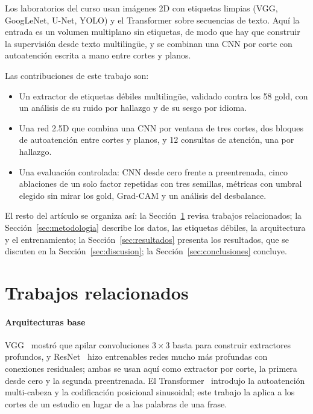 \documentclass[conference]{IEEEtran}
\begin{document}
Los laboratorios del curso usan imágenes 2D con etiquetas limpias (VGG, GoogLeNet, U-Net, YOLO) y el Transformer sobre secuencias de texto.
Aquí la entrada es un volumen multiplano sin etiquetas, de modo que hay que construir la supervisión desde texto multilingüe, y se combinan una CNN por corte con autoatención escrita a mano entre cortes y planos.

Las contribuciones de este trabajo son:
\begin{itemize}
  \item Un extractor de etiquetas débiles multilingüe, validado contra los 58 gold, con un análisis de su ruido por hallazgo y de su sesgo por idioma.
  \item Una red 2.5D que combina una CNN por ventana de tres cortes, dos bloques de autoatención entre cortes y planos, y 12 consultas de atención, una por hallazgo.
  \item Una evaluación controlada: CNN desde cero frente a preentrenada, cinco ablaciones de un solo factor repetidas con tres semillas, métricas con umbral elegido sin mirar los gold, Grad-CAM y un análisis del desbalance.
\end{itemize}

El resto del artículo se organiza así: la Sección~\ref{sec:relacionados} revisa trabajos relacionados; la Sección~\ref{sec:metodologia} describe los datos, las etiquetas débiles, la arquitectura y el entrenamiento; la Sección~\ref{sec:resultados} presenta los resultados, que se discuten en la Sección~\ref{sec:discusion}; la Sección~\ref{sec:conclusiones} concluye.

\section{Trabajos relacionados}
\label{sec:relacionados}

\paragraph*{Arquitecturas base}
VGG~\cite{simonyan2015vgg} mostró que apilar convoluciones $3\times3$ basta para construir extractores profundos, y ResNet~\cite{he2016resnet} hizo entrenables redes mucho más profundas con conexiones residuales; ambas se usan aquí como extractor por corte, la primera desde cero y la segunda preentrenada.
El Transformer~\cite{vaswani2017attention} introdujo la autoatención multi-cabeza y la codificación posicional sinusoidal; este trabajo la aplica a los cortes de un estudio en lugar de a las palabras de una frase.
\end{document}
